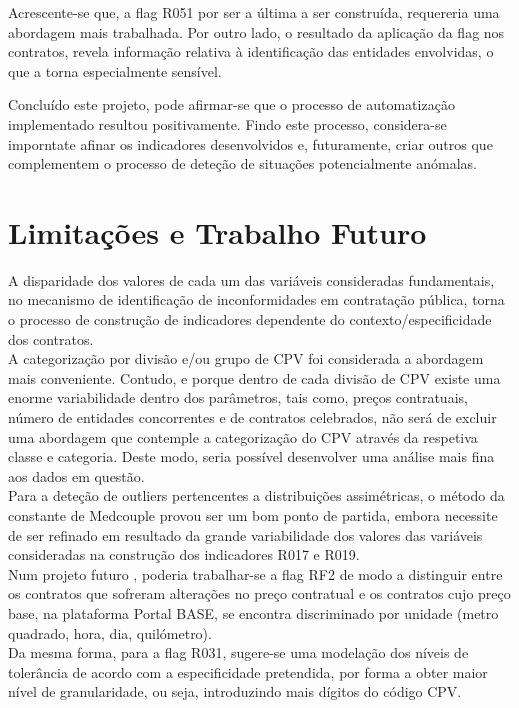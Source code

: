 Acrescente-se que, a flag R051 por ser a última a ser construída, requereria uma abordagem mais trabalhada. Por outro lado, o resultado da aplicação da flag nos contratos, revela informação relativa à identificação das entidades envolvidas, o que a torna especialmente sensível. 



Concluído este projeto, pode afirmar-se que o processo de automatização implementado resultou positivamente. Findo este processo, considera-se imporntate afinar os indicadores desenvolvidos e, futuramente, criar outros que complementem o processo de deteção de situações potencialmente anómalas.








\section{Limitações e Trabalho Futuro}

A disparidade dos valores de cada um das variáveis consideradas fundamentais, no mecanismo de identificação de inconformidades em contratação pública, torna o processo de construção de indicadores dependente do contexto/especificidade dos contratos. \\

A categorização por divisão e/ou grupo de CPV foi considerada a abordagem mais conveniente. Contudo, e porque dentro de cada divisão de CPV existe uma enorme variabilidade dentro dos parâmetros, tais como, preços contratuais, número de entidades concorrentes e de contratos celebrados, não será de excluir uma abordagem que contemple a categorização do CPV através da respetiva classe e categoria. Deste modo, seria possível desenvolver uma análise mais fina aos dados em questão. \\


Para a deteção de outliers pertencentes a distribuições assimétricas, o método da constante de Medcouple provou ser um bom ponto de partida, embora necessite de ser refinado em resultado da grande variabilidade dos valores das variáveis consideradas na construção dos indicadores R017 e R019.  \\


Num projeto futuro , poderia trabalhar-se a flag RF2 de modo a distinguir entre os contratos que sofreram alterações no preço contratual e os contratos cujo preço base, na plataforma Portal BASE, se encontra discriminado por unidade (metro quadrado, hora, dia, quilómetro). \\

Da mesma forma, para a flag R031, sugere-se uma modelação dos níveis de tolerância de acordo com a especificidade pretendida, por forma a obter maior nível de granularidade, ou seja, introduzindo mais dígitos do código CPV.




















